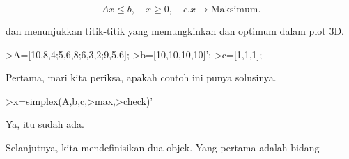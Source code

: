 \documentclass{article}
\begin{document}
\begin{eulernotebook}
\begin{eulercomment}
\begin{eulercomment}
\begin{eulercomment}
\begin{eulercomment}
\begin{eulercomment}
\end{eulercomment}
\begin{eulerformula}
\[
Ax \le b, \quad x \ge 0, \quad c.x \to \text{Maksimum.}
\]
\end{eulerformula}
\begin{eulercomment}
dan menunjukkan titik-titik yang memungkinkan dan optimum dalam plot
3D.
\end{eulercomment}
\begin{eulerprompt}
>A=[10,8,4;5,6,8;6,3,2;9,5,6];
>b=[10,10,10,10]';
>c=[1,1,1];
\end{eulerprompt}
\begin{eulercomment}
Pertama, mari kita periksa, apakah contoh ini punya solusinya.
\end{eulercomment}
\begin{eulerprompt}
>x=simplex(A,b,c,>max,>check)'
\end{eulerprompt}
\begin{euleroutput}
  [0,  1,  0.5]
\end{euleroutput}
\begin{eulercomment}
Ya, itu sudah ada.

Selanjutnya, kita mendefinisikan dua objek. Yang pertama adalah bidang


\end{eulercomment}
\end{eulercomment}
\end{eulercomment}
\end{eulercomment}
\end{eulercomment}
\end{eulernotebook}
\end{document}
